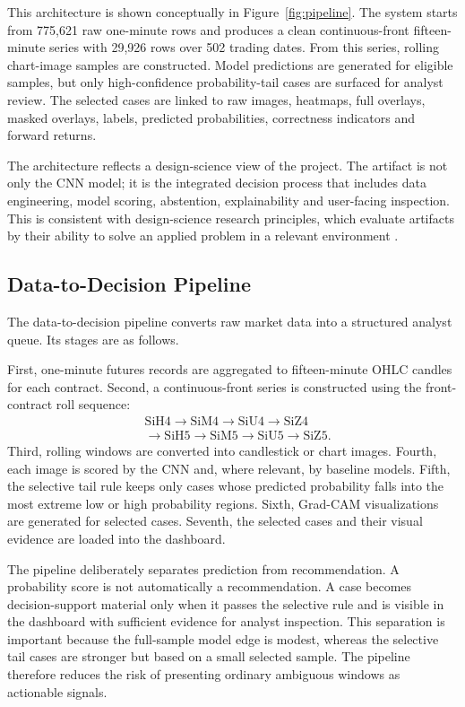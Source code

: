 This architecture is shown conceptually in Figure~\ref{fig:pipeline}. The system starts from 775,621 raw one-minute rows and produces a clean continuous-front fifteen-minute series with 29,926 rows over 502 trading dates. From this series, rolling chart-image samples are constructed. Model predictions are generated for eligible samples, but only high-confidence probability-tail cases are surfaced for analyst review. The selected cases are linked to raw images, heatmaps, full overlays, masked overlays, labels, predicted probabilities, correctness indicators and forward returns.

The architecture reflects a design-science view of the project. The artifact is not only the CNN model; it is the integrated decision process that includes data engineering, model scoring, abstention, explainability and user-facing inspection. This is consistent with design-science research principles, which evaluate artifacts by their ability to solve an applied problem in a relevant environment \cite{hevner_dsr,peffers_dsrm,venable_feds}.

\subsection{Data-to-Decision Pipeline}
\label{subsec:data_to_decision}

The data-to-decision pipeline converts raw market data into a structured analyst queue. Its stages are as follows.

First, one-minute futures records are aggregated to fifteen-minute OHLC candles for each contract. Second, a continuous-front series is constructed using the front-contract roll sequence:
\[
\begin{aligned}
&\text{SiH4} \rightarrow \text{SiM4} \rightarrow \text{SiU4} \rightarrow \text{SiZ4}\\
&\rightarrow \text{SiH5} \rightarrow \text{SiM5} \rightarrow \text{SiU5} \rightarrow \text{SiZ5}.
\end{aligned}
\]
Third, rolling windows are converted into candlestick or chart images. Fourth, each image is scored by the CNN and, where relevant, by baseline models. Fifth, the selective tail rule keeps only cases whose predicted probability falls into the most extreme low or high probability regions. Sixth, Grad-CAM visualizations are generated for selected cases. Seventh, the selected cases and their visual evidence are loaded into the dashboard.

The pipeline deliberately separates prediction from recommendation. A probability score is not automatically a recommendation. A case becomes decision-support material only when it passes the selective rule and is visible in the dashboard with sufficient evidence for analyst inspection. This separation is important because the full-sample model edge is modest, whereas the selective tail cases are stronger but based on a small selected sample. The pipeline therefore reduces the risk of presenting ordinary ambiguous windows as actionable signals.

